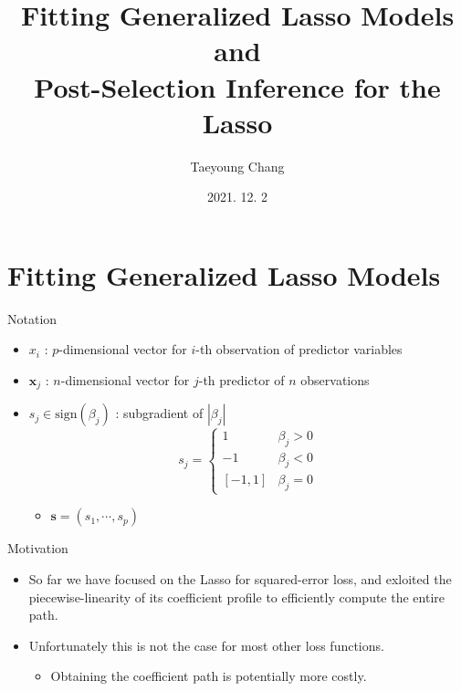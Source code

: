 \documentclass[11pt]{beamer}
\title[Section 16.5 - 16.6]{Fitting Generalized Lasso Models and \\ Post-Selection Inference for the Lasso
}
\author{
Taeyoung Chang
}
\date{2021. 12. 2}
\begin{document}
\begin{frame}
  \titlepage
\end{frame}


\section{Fitting Generalized Lasso Models}

\begin{frame}{Notation}
\begin{itemize}
    \item $x_i$ : $p$-dimensional vector for $i$-th observation of predictor variables
    \item $\mathbf{x}_j$ : $n$-dimensional vector for $j$-th predictor of $n$ observations
    \item $s_j\in \text{sign}(\beta_j)$ : subgradient of $|\beta_j|$
    $$s_j=\begin{cases}
        1 & \beta_j>0 \\ -1 & \beta_j<0 \\ [-1,1] & \beta_j=0
    \end{cases} $$
    \begin{itemize}
        \item $\mathbf{s} = (s_1, \cdots, s_p)$
    \end{itemize}
\end{itemize}
\end{frame}

\begin{frame}{Motivation}
\begin{itemize}
    \item So far we have focused on the Lasso for squared-error loss, and exloited the piecewise-linearity of its coefficient profile to efficiently compute the entire path.
    \item Unfortunately this is not the case for most other loss functions.
    \begin{itemize}
        \item Obtaining the coefficient path is potentially more costly.
    \end{itemize}
\end{itemize}
\end{frame}
\end{document}
